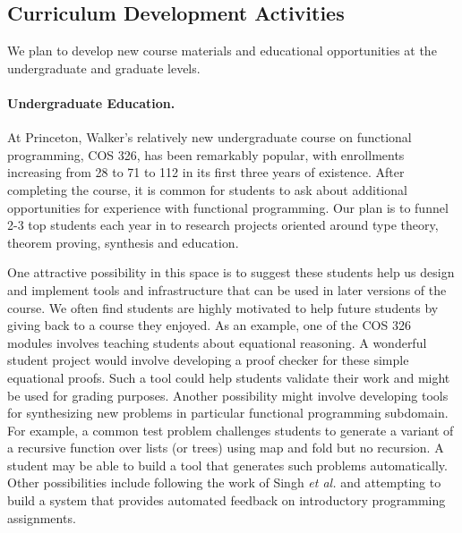 \subsection{Curriculum Development Activities}

We plan to develop new course materials and educational opportunities
at the undergraduate and graduate levels.  

\paragraph*{Undergraduate Education.}
At Princeton, Walker's relatively new undergraduate
course on functional programming, COS 326, has been remarkably popular,
with enrollments increasing from 28 to 71 to 112 in its first three
years of existence.  After completing the course, it is common for students
to ask about additional opportunities for experience
with functional programming. Our plan is to funnel 2-3 top
students each year in to research projects
oriented around type theory, theorem proving, synthesis and education.  

One attractive possibility in this space is to suggest
these students help us design and implement tools and infrastructure
that can be used in later versions of the course.   We often find students
are highly motivated to help future students by giving back to a course
they enjoyed.  As an example,
one of the COS 326 modules involves teaching students about equational
reasoning.  A wonderful student project would involve developing a proof 
checker for these simple equational proofs.  Such a tool could help students
validate their work and might be used for grading purposes.
Another possibility might involve developing tools for synthesizing
new problems in particular functional programming subdomain.  For example,
a common test problem challenges students to generate a variant of a
recursive function over lists (or trees) using map and fold but no recursion.
A student may be able to build a tool that generates such problems 
automatically.  Other possibilities include following the work of 
Singh \emph{et al.} \cite{singh-pldi-2013} and attempting to build a system
that provides automated feedback on introductory programming assignments.

